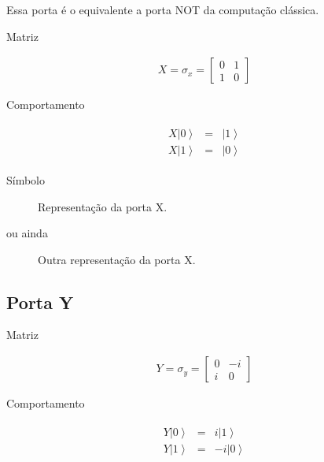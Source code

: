Essa porta é o equivalente a porta NOT da computação clássica.

Matriz

\[\begin{aligned}
X = \sigma_x =
\begin{bmatrix}
    0 & 1 \\
    1 & 0
\end{bmatrix}
\end{aligned}\]

Comportamento

\[\begin{aligned}
\begin{matrix}
    X \left| 0 \right\rangle &=& \left| 1 \right\rangle \\
    X \left| 1 \right\rangle &=& \left| 0 \right\rangle
\end{matrix}
\end{aligned}\]

Símbolo

\begin{figure}[!htp]
    \centering
    
    \caption{Representação da porta X.}
    \label{fig:xgate}
\end{figure}

ou ainda

\begin{figure}[!htp]
    \centering
    
    \caption{Outra representação da porta X.}
    \label{fig:targ-gate}
\end{figure}


\subsection{Porta Y}\label{subsec:porta-y}

Matriz

\[\begin{aligned}
Y = \sigma_y =
\begin{bmatrix}
    0 & -i \\
    i & 0
\end{bmatrix}
\end{aligned}\]

Comportamento

\[\begin{aligned}
\begin{matrix}
    Y \left| 0 \right\rangle &=& i\left| 1 \right\rangle \\
    Y \left| 1 \right\rangle &=& -i\left| 0 \right\rangle
\end{matrix}
\end{aligned}\]

